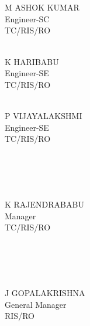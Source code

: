 \documentclass[a4paper, 12pt, oneside]{Thesis}  %
\begin{document}
	
	
	\noindent 
	
	
	
	
	\vspace*{1in}
	
	\parbox{1.8in}
	{
		 \\
		\noindent {\bf } \\
		\noindent             M ASHOK KUMAR \\ 
		\noindent Engineer-SC\\
		\noindent TC/RIS/RO\\
	} 
	\hspace*{0.20in} 
	\parbox{1.5in}
	{
		\noindent {\bf} \\
		
		\noindent             K HARIBABU\\ 
		\noindent Engineer-SE\\
		\noindent TC/RIS/RO\\
		
		
	}  
	\hspace*{0.20in} 
	\parbox{1.8in}
	{
		\noindent {\bf} \\
		
		\noindent             P VIJAYALAKSHMI\\ 
		\noindent Engineer-SE\\
		\noindent TC/RIS/RO\\
		
		
	}
	
	\vspace*{0.25in}
	
	\parbox{2.2in}
	{
		\noindent {\bf} \\ \\
		 \\
		\noindent {\bf} \\
		\noindent             K RAJENDRABABU \\ 
		\noindent Manager\\
		\noindent TC/RIS/RO\\
		\noindent {\bf} \\
		\noindent {\bf} \\
	} 
	\parbox{2.2in}
	{
	\noindent {\bf } \\
	\noindent {\bf } \\
	\noindent J GOPALAKRISHNA \\ 
	\noindent General Manager\\
	\noindent RIS/RO\\
	} 
\hspace*{0.20in} 
	
\end{document}

